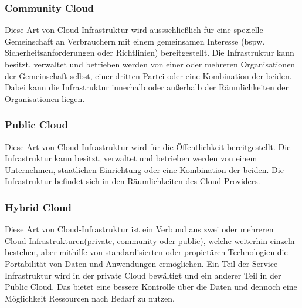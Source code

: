 \subsubsection{Community Cloud}
Diese Art von Cloud-Infrastruktur wird aussschließlich für eine spezielle Gemeinschaft an Verbrauchern mit einem gemeinsamen Interesse (bspw. Sicherheitsanforderungen oder Richtlinien) bereitgestellt. Die Infrastruktur kann besitzt, verwaltet und betrieben werden von einer oder mehreren Organisationen der Gemeinschaft selbst, einer dritten Partei oder eine Kombination der beiden. Dabei kann die Infrastruktur innerhalb oder außerhalb der Räumlichkeiten der Organisationen liegen\cite{nist_definition}.

\subsubsection{Public Cloud}
Diese Art von Cloud-Infrastruktur wird für die Öffentlichkeit bereitgestellt. Die Infrastruktur kann besitzt, verwaltet und betrieben werden von einem Unternehmen, staatlichen Einrichtung oder eine Kombination der beiden. Die Infrastruktur befindet sich in den Räumlichkeiten des Cloud-Providers\cite{nist_definition}.

\subsubsection{Hybrid Cloud}
Diese Art von Cloud-Infrastruktur ist ein Verbund aus zwei oder mehreren Cloud-Infrastrukturen(private, community oder public), welche weiterhin einzeln bestehen, aber mithilfe von standardisierten oder propietären Technologien die Portabilität von Daten und Anwendungen ermöglichen\cite{nist_definition}. Ein Teil der Service-Infrastruktur wird in der private Cloud bewältigt und ein anderer Teil in der Public Cloud. Das bietet eine bessere Kontrolle über die Daten und dennoch eine Möglichkeit Ressourcen nach Bedarf zu nutzen\cite{study_cc_cdb}.



